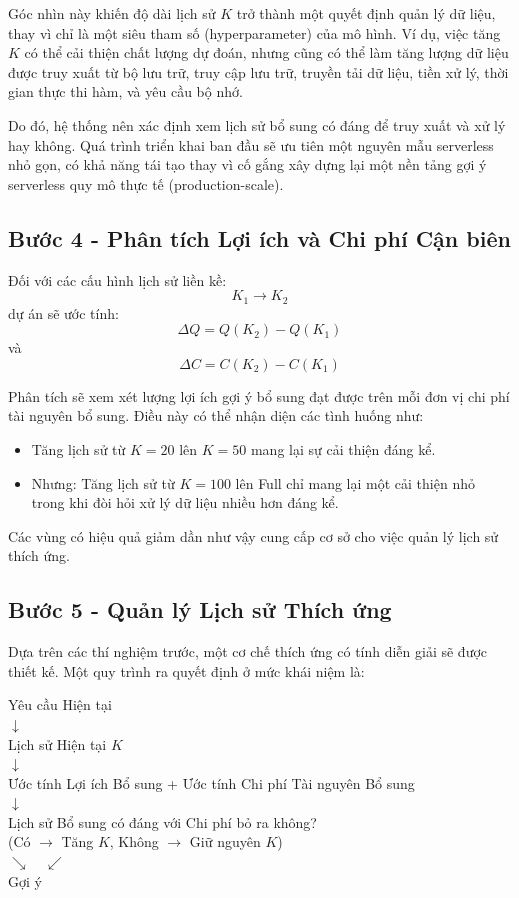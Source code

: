 \documentclass[12pt,a4paper]{article}
\begin{document}
Góc nhìn này khiến độ dài lịch sử $K$ trở thành một quyết định quản lý dữ liệu, thay vì chỉ là một siêu tham số (hyperparameter) của mô hình. Ví dụ, việc tăng $K$ có thể cải thiện chất lượng dự đoán, nhưng cũng có thể làm tăng lượng dữ liệu được truy xuất từ bộ lưu trữ, truy cập lưu trữ, truyền tải dữ liệu, tiền xử lý, thời gian thực thi hàm, và yêu cầu bộ nhớ.

Do đó, hệ thống nên xác định xem lịch sử bổ sung có đáng để truy xuất và xử lý hay không. Quá trình triển khai ban đầu sẽ ưu tiên một nguyên mẫu serverless nhỏ gọn, có khả năng tái tạo thay vì cố gắng xây dựng lại một nền tảng gợi ý serverless quy mô thực tế (production-scale).

\subsection{Bước 4 - Phân tích Lợi ích và Chi phí Cận biên}
Đối với các cấu hình lịch sử liền kề:
\[ K_1 \rightarrow K_2 \]
dự án sẽ ước tính:
\[ \Delta Q = Q(K_2) - Q(K_1) \]
và
\[ \Delta C = C(K_2) - C(K_1) \]

Phân tích sẽ xem xét lượng lợi ích gợi ý bổ sung đạt được trên mỗi đơn vị chi phí tài nguyên bổ sung. Điều này có thể nhận diện các tình huống như:
\begin{itemize}
    \item Tăng lịch sử từ $K=20$ lên $K=50$ mang lại sự cải thiện đáng kể.
    \item Nhưng: Tăng lịch sử từ $K=100$ lên Full chỉ mang lại một cải thiện nhỏ trong khi đòi hỏi xử lý dữ liệu nhiều hơn đáng kể.
\end{itemize}
Các vùng có hiệu quả giảm dần như vậy cung cấp cơ sở cho việc quản lý lịch sử thích ứng.

\subsection{Bước 5 - Quản lý Lịch sử Thích ứng}
Dựa trên các thí nghiệm trước, một cơ chế thích ứng có tính diễn giải sẽ được thiết kế. Một quy trình ra quyết định ở mức khái niệm là:

\begin{center}
Yêu cầu Hiện tại \\
$\downarrow$ \\
Lịch sử Hiện tại $K$ \\
$\downarrow$ \\
Ước tính Lợi ích Bổ sung + Ước tính Chi phí Tài nguyên Bổ sung \\
$\downarrow$ \\
Lịch sử Bổ sung có đáng với Chi phí bỏ ra không? \\
(Có $\rightarrow$ Tăng $K$, Không $\rightarrow$ Giữ nguyên $K$) \\
$\searrow \quad \swarrow$ \\
Gợi ý
\end{center}
\end{document}
